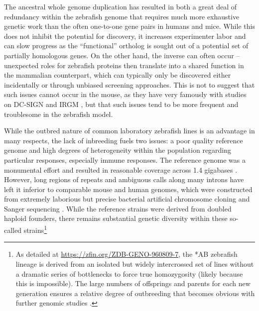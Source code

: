 The ancestral whole genome duplication has resulted in both a great deal of redundancy within the zebrafish genome that requires much more exhaustive genetic work than the often one\hyp{}to\hyp{}one gene pairs in humans and mice. While this does not inhibit the potential for discovery, it increases experimenter labor and can slow progress as the ``functional'' ortholog is sought out of a potential set of partially homologous genes. On the other hand, the inverse can often occur -- unexpected roles for zebrafish proteins then translate into a shared function in the mammalian counterpart, which can typically only be discovered either incidentally or through unbiased screening approaches. This is not to suggest that such issues cannot occur in the mouse, as they have very famously with studies on DC\hyp{}SIGN \citep{Tanne2009, GarciaVallejo2013} and IRGM \citep{Singh2006, Henry2009, Bekpen2009, Singh2010, Bekpen2010, Dockterman2022}, but that such issues tend to be more frequent and troublesome in the zebrafish model.

While the outbred nature of common laboratory zebrafish lines is an advantage in many respects, the lack of inbreeding fuels two issues: a poor quality reference genome and high degrees of heterogeneity within the population regarding particular responses, especially immune responses. The reference genome was a monumental effort and resulted in reasonable coverage across 1.4 gigabases \citep{Howe2013}. However, long regions of repeats and ambiguous calls along many introns have left it inferior to comparable mouse and human genomes, which were constructed from extremely laborious but precise bacterial artificial chromosome cloning and Sanger sequencing \citep{Osoegawa2000}. While the reference strains were derived from doubled haploid founders, there remains substantial genetic diversity within these so\hyp{}called strains\footnote{As detailed at \url{https://zfin.org/ZDB-GENO-960809-7}, the *AB zebrafish lineage is derived from an isolated but widely intercrossed set of lines without a dramatic series of bottlenecks to force true homozygosity (likely because this is impossible). The large numbers of offsprings and parents for each new generation ensures a relative degree of outbreeding that becomes obvious with further genomic studies \citep{Holden2018, Suurvali2020, Deng2022, ZFIN2022}.}

